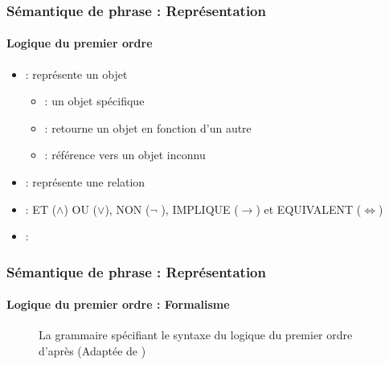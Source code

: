 \documentclass[xcolor=table]{beamer}
\begin{document}
\begin{frame}
	\frametitle{Sémantique de phrase : Représentation}
	\framesubtitle{Logique du premier ordre}
	
	\begin{itemize}
		\item {} : représente un objet
		\begin{itemize}
			\item {} : un objet spécifique
			
			
			\item {} : retourne un objet en fonction d'un autre
			
			
			\item {} : référence vers un objet inconnu 
			
			
		\end{itemize}
		\item {} : représente une relation 
		
		
		\item {} : ET ($ \wedge $) OU ($ \vee $), NON ($ \neg $ ), IMPLIQUE ($\rightarrow$) et EQUIVALENT ($ \Leftrightarrow $)
		
		
		\item {} : 
		
		
	\end{itemize}
	
\end{frame}

\begin{frame}
	\frametitle{Sémantique de phrase : Représentation}
	\framesubtitle{Logique du premier ordre : Formalisme}
	
	\begin{figure}
		\caption{La grammaire spécifiant le syntaxe du logique du premier ordre d'après \cite{2019-jurafsky-martin} (Adaptée de \cite{2002-russell-norvig})}
	\end{figure}
	
\end{frame}
\end{document}
